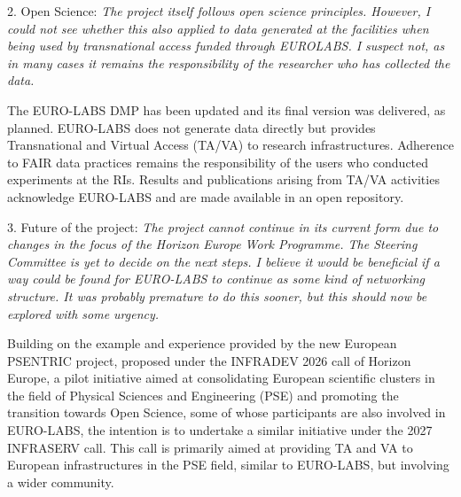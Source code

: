 {2. Open Science:
{\it The project itself follows open science principles. However, I could not see whether this also applied to data generated
at the facilities when being used by transnational access funded through EUROLABS. I suspect not, as in many cases
it remains the responsibility of the researcher who has collected the data.}}

{The EURO-LABS DMP has been updated and its final version was delivered, as planned. EURO-LABS does not generate data directly but provides Transnational and Virtual Access (TA/VA) to research infrastructures. Adherence to FAIR data practices remains the responsibility of the users who conducted experiments at the RIs. Results and publications arising from TA/VA activities acknowledge EURO-LABS and are made available in an open repository.}


{3. Future of the project: 
 {\it The project cannot continue in its current form due to changes in the focus of the Horizon Europe Work
Programme. The Steering Committee is yet to decide on the next steps. I believe it would be beneficial if a way could
be found for EURO-LABS to continue as some kind of networking structure.
 It was probably premature to do this sooner, but this should now be explored with some urgency.}}

{Building on the example and experience provided by the new European PSENTRIC project, proposed under the INFRADEV 2026 call of Horizon Europe, a pilot initiative aimed at consolidating European scientific clusters in the field of Physical Sciences and Engineering (PSE) and promoting the transition towards Open Science, some of whose participants are also involved in EURO-LABS, the intention is to undertake a similar initiative under the 2027 INFRASERV call. This call is primarily aimed at providing TA and VA to European infrastructures in the PSE field, similar to EURO-LABS, but involving a wider community.}



